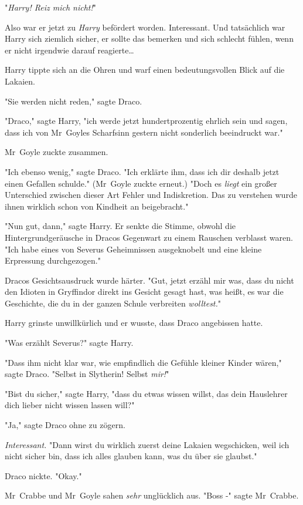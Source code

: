 {"\emph{Harry! Reiz mich nicht!}"

Also war er jetzt zu \emph{Harry} befördert worden. Interessant. Und tatsächlich war Harry sich ziemlich sicher, er sollte das bemerken und sich schlecht fühlen, wenn er nicht irgendwie darauf reagierte…

Harry tippte sich an die Ohren und warf einen bedeutungsvollen Blick auf die Lakaien.

"Sie werden nicht reden," sagte Draco.

"Draco," sagte Harry, "ich werde jetzt hundertprozentig ehrlich sein und sagen, dass ich von Mr~Goyles Scharfsinn gestern nicht sonderlich beeindruckt war."

Mr~Goyle zuckte zusammen.

"Ich ebenso wenig," sagte Draco. "Ich erklärte ihm, dass ich dir deshalb jetzt einen Gefallen schulde." (Mr~Goyle zuckte erneut.) "Doch es \emph{liegt} ein großer Unterschied zwischen dieser Art Fehler und Indiskretion. Das zu verstehen wurde ihnen wirklich schon von Kindheit an beigebracht."

"Nun gut, dann," sagte Harry. Er senkte die Stimme, obwohl die Hintergrundgeräusche in Dracos Gegenwart zu einem Rauschen verblasst waren. "Ich habe eines von Severus Geheimnissen ausgeknobelt und eine kleine Erpressung durchgezogen."

Dracos Gesichtsausdruck wurde härter. "Gut, jetzt erzähl mir was, dass du nicht den Idioten in Gryffindor direkt ins Gesicht gesagt hast, was heißt, es war die Geschichte, die du in der ganzen Schule verbreiten \emph{wolltest.}"

Harry grinste unwillkürlich und er wusste, dass Draco angebissen hatte.

"Was erzählt Severus?" sagte Harry.

"Dass ihm nicht klar war, wie empfindlich die Gefühle kleiner Kinder wären," sagte Draco. "Selbst in Slytherin! Selbst \emph{mir!}"

"Bist du sicher," sagte Harry, "dass du etwas wissen willst, das dein Hauslehrer dich lieber nicht wissen lassen will?"

"Ja," sagte Draco ohne zu zögern.

\emph{Interessant.} "Dann wirst du wirklich zuerst deine Lakaien wegschicken, weil ich nicht sicher bin, dass ich alles glauben kann, was du über sie glaubst."

Draco nickte. "Okay."

Mr~Crabbe und Mr~Goyle sahen \emph{sehr} unglücklich aus. "Boss -" sagte Mr~Crabbe.

}
